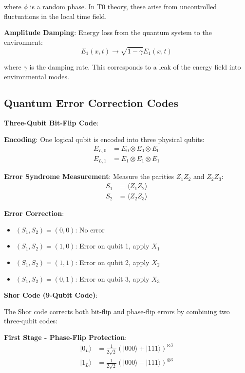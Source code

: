 \documentclass[12pt,a4paper]{article}
\theoremstyle{definition}
\theoremstyle{remark}
\begin{document}
	where $\phi$ is a random phase. In T0 theory, these arise from uncontrolled fluctuations in the local time field.
	
	\textbf{Amplitude Damping}:
	Energy loss from the quantum system to the environment:
	\begin{equation}
		E_1(x,t) \rightarrow \sqrt{1-\gamma} E_1(x,t)
	\end{equation}
	
	where $\gamma$ is the damping rate. This corresponds to a leak of the energy field into environmental modes.
	
	\subsection{Quantum Error Correction Codes}
	
	\textbf{Three-Qubit Bit-Flip Code}:
	
	\textbf{Encoding}:
	One logical qubit is encoded into three physical qubits:
	\begin{align}
		E_{L,0} &= E_0 \otimes E_0 \otimes E_0 \\
		E_{L,1} &= E_1 \otimes E_1 \otimes E_1
	\end{align}
	
	\textbf{Error Syndrome Measurement}:
	Measure the parities $Z_1 Z_2$ and $Z_2 Z_3$:
	\begin{align}
		S_1 &= \langle Z_1 Z_2 \rangle \\
		S_2 &= \langle Z_2 Z_3 \rangle
	\end{align}
	
	\textbf{Error Correction}:
	\begin{itemize}
		\item $(S_1, S_2) = (0, 0)$: No error
		\item $(S_1, S_2) = (1, 0)$: Error on qubit 1, apply $X_1$
		\item $(S_1, S_2) = (1, 1)$: Error on qubit 2, apply $X_2$  
		\item $(S_1, S_2) = (0, 1)$: Error on qubit 3, apply $X_3$
	\end{itemize}
	
	\textbf{Shor Code (9-Qubit Code)}:
	
	The Shor code corrects both bit-flip and phase-flip errors by combining two three-qubit codes:
	
	\textbf{First Stage - Phase-Flip Protection}:
	\begin{align}
		|0_L\rangle &= \frac{1}{2\sqrt{2}}(|000\rangle + |111\rangle)^{\otimes 3} \\
		|1_L\rangle &= \frac{1}{2\sqrt{2}}(|000\rangle - |111\rangle)^{\otimes 3}
	\end{align}
	
\end{document}
